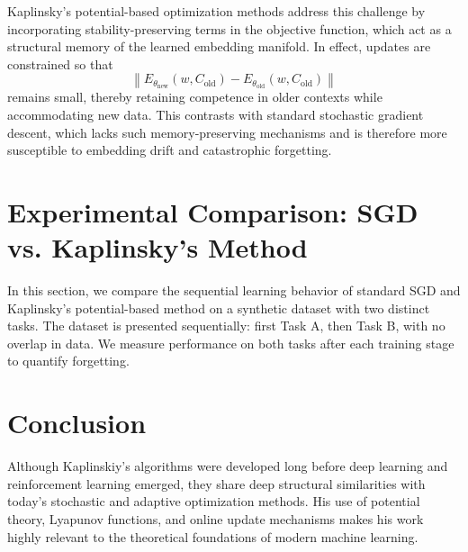 \documentclass[12pt]{article}
\begin{document}
Kaplinsky's potential-based optimization methods address this challenge by incorporating 
stability-preserving terms in the objective function, which act as a structural memory 
of the learned embedding manifold. In effect, updates are constrained so that
\[
\left\| E_{\theta_{\mathrm{new}}}(w, C_{\mathrm{old}}) - E_{\theta_{\mathrm{old}}}(w, C_{\mathrm{old}}) \right\|
\]
remains small, thereby retaining competence in older contexts while accommodating new data. 
This contrasts with standard stochastic gradient descent, which lacks such 
memory-preserving mechanisms and is therefore more susceptible to embedding drift 
and catastrophic forgetting.

\section{Experimental Comparison: SGD vs. Kaplinsky's Method}

In this section, we compare the sequential learning behavior of standard SGD 
and Kaplinsky's potential-based method on a synthetic dataset with two distinct tasks. 
The dataset is presented sequentially: first Task A, then Task B, with no overlap in data. 
We measure performance on both tasks after each training stage to quantify forgetting.

\section{Conclusion}
Although Kaplinskiy's algorithms were developed long before deep learning and reinforcement learning emerged, they share deep structural similarities with today's stochastic and adaptive optimization methods. His use of potential theory, Lyapunov functions, and online update mechanisms makes his work highly relevant to the theoretical foundations of modern machine learning.
\end{document}
